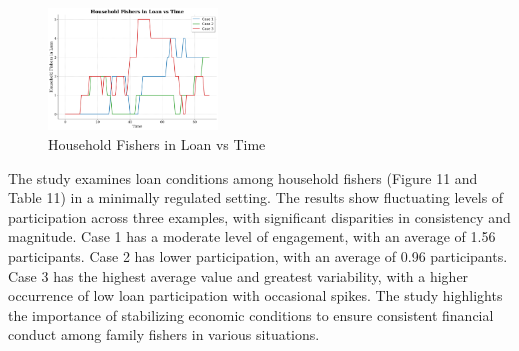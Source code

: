 \documentclass[final,5p,times,twocolumn,authoryear]{elsarticle}
\begin{document}
\begin{figure}[htbp]
    \centering
    \includegraphics[width=0.4\textwidth]{graph_all/plots_mod/household_fishers_in_loan_vs_time.png}
    \caption{Household Fishers in Loan vs Time}
    \label{fig:household_loan}
\end{figure}
\begin{table}[htbp]
    \centering
    \caption{Household Fishers in Loan - Statistical Analysis}
\end{table}
The study examines loan conditions among household fishers (Figure 11 and Table 11)  in a minimally regulated setting. The results show fluctuating levels of participation across three examples, with significant disparities in consistency and magnitude. Case 1 has a moderate level of engagement, with an average of 1.56 participants. Case 2 has lower participation, with an average of 0.96 participants. Case 3 has the highest average value and greatest variability, with a higher occurrence of low loan participation with occasional spikes. The study highlights the importance of stabilizing economic conditions to ensure consistent financial conduct among family fishers in various situations.\\
\end{document}
